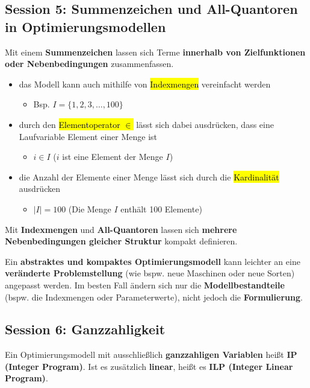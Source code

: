 \documentclass[a4paper, 10pt]{article}
\begin{document}
\subsection{Session 5: Summenzeichen und All-Quantoren in Optimierungsmodellen}
\begin{definitionbox}
    Mit einem \textbf{Summenzeichen} lassen sich
Terme \textbf{innerhalb von Zielfunktionen oder
Nebenbedingungen} zusammenfassen.
\end{definitionbox}
\begin{itemize}
    \item das Modell kann auch mithilfe von \hl{Indexmengen} vereinfacht werden
    \begin{itemize}
        \item Bsp. $I = \{1,2,3,\dots,100\}$
    \end{itemize}
    \item durch den \hl{Elementoperator $\in$} lässt sich dabei ausdrücken, dass eine Laufvariable Element einer Menge ist
    \begin{itemize}
        \item $i \in I$ \qquad ($i$ ist eine Element der Menge $I$)
    \end{itemize}

    \item  die Anzahl der Elemente einer Menge lässt sich durch die \hl{Kardinalität} ausdrücken
    \begin{itemize}
        \item $|I| = 100$ \qquad (Die Menge $I$ enthält 100 Elemente)
    \end{itemize}
\end{itemize}

\noindent\begin{definitionbox}
    Mit \textbf{Indexmengen} und \textbf{All-Quantoren} lassen sich
\textbf{mehrere Nebenbedingungen gleicher Struktur}
kompakt definieren.
\end{definitionbox}

\noindent\begin{definitionbox}
    Ein \textbf{abstraktes und kompaktes Optimierungsmodell} kann leichter an eine \textbf{veränderte
Problemstellung} (wie bspw. neue Maschinen oder neue Sorten) angepasst werden. Im besten
Fall ändern sich nur die \textbf{Modellbestandteile} (bspw. die Indexmengen oder Parameterwerte),
nicht jedoch die \textbf{Formulierung}.
\end{definitionbox}
\subsection{Session 6: Ganzzahligkeit}
\begin{definitionbox}
    Ein Optimierungsmodell mit ausschließlich \textbf{ganzzahligen Variablen}
heißt \textbf{IP (Integer Program)}. Ist es zusätzlich \textbf{linear}, heißt es \textbf{ILP
(Integer Linear Program)}.
\end{definitionbox}
\end{document}
